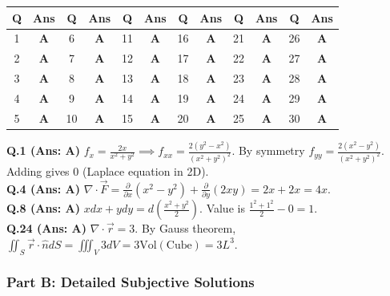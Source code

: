 \begin{center}
\begin{tabular}{|c|c||c|c||c|c||c|c||c|c||c|c|}
\hline
\textbf{Q} & \textbf{Ans} & \textbf{Q} & \textbf{Ans} & \textbf{Q} & \textbf{Ans} & \textbf{Q} & \textbf{Ans} & \textbf{Q} & \textbf{Ans} & \textbf{Q} & \textbf{Ans} \\
\hline
1 & \textbf{A} & 6 & \textbf{A} & 11 & \textbf{A} & 16 & \textbf{A} & 21 & \textbf{A} & 26 & \textbf{A} \\
2 & \textbf{A} & 7 & \textbf{A} & 12 & \textbf{A} & 17 & \textbf{A} & 22 & \textbf{A} & 27 & \textbf{A} \\
3 & \textbf{A} & 8 & \textbf{A} & 13 & \textbf{A} & 18 & \textbf{A} & 23 & \textbf{A} & 28 & \textbf{A} \\
4 & \textbf{A} & 9 & \textbf{A} & 14 & \textbf{A} & 19 & \textbf{A} & 24 & \textbf{A} & 29 & \textbf{A} \\
5 & \textbf{A} & 10 & \textbf{A} & 15 & \textbf{A} & 20 & \textbf{A} & 25 & \textbf{A} & 30 & \textbf{A} \\
\hline
\end{tabular}
\end{center}

\begin{solutionbox}
\textbf{Q.1 (Ans: A)} $f_x = \frac{2x}{x^2+y^2} \implies f_{xx} = \frac{2(y^2-x^2)}{(x^2+y^2)^2}$. By symmetry $f_{yy} = \frac{2(x^2-y^2)}{(x^2+y^2)^2}$. Adding gives $0$ (Laplace equation in 2D).\\[1.5mm]
\textbf{Q.4 (Ans: A)} $\nabla \cdot \vec{F} = \frac{\partial}{\partial x}(x^2 - y^2) + \frac{\partial}{\partial y}(2xy) = 2x + 2x = 4x$.\\[1.5mm]
\textbf{Q.8 (Ans: A)} $x dx + y dy = d\left(\frac{x^2+y^2}{2}\right)$. Value is $\frac{1^2+1^2}{2} - 0 = 1$.\\[1.5mm]
\textbf{Q.24 (Ans: A)} $\nabla \cdot \vec{r} = 3$. By Gauss theorem, $\iint_S \vec{r} \cdot \hat{n} dS = \iiint_V 3 dV = 3 \text{Vol}(\text{Cube}) = 3L^3$.
\end{solutionbox}

\subsubsection*{Part B: Detailed Subjective Solutions}

